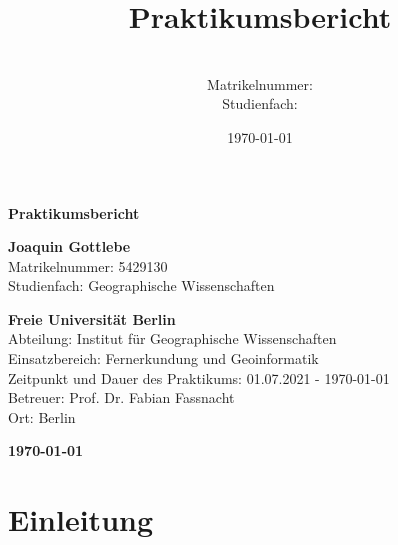 \documentclass[12pt,a4paper]{report}
\title{Praktikumsbericht}
\author{ \\ Matrikelnummer:  \\ Studienfach: }
\date{\today}
\begin{document}
\begin{titlepage}
    \begin{center}
        \vspace*{1cm}
        
        \textbf{\Large Praktikumsbericht}
        
        \vspace{1.5cm}
        
        \textbf{Joaquin Gottlebe} \\
        Matrikelnummer: 5429130 \\
        Studienfach: Geographische Wissenschaften
        
        \vspace{1.5cm}
        
        \textbf{Freie Universität Berlin} \\
        Abteilung: Institut für Geographische Wissenschaften \\
        Einsatzbereich: Fernerkundung und Geoinformatik \\
        Zeitpunkt und Dauer des Praktikums: 01.07.2021 - \today \\
        Betreuer: Prof. Dr. Fabian Fassnacht \\
        Ort: Berlin
        
        \vspace{1.5cm}
        
        \textbf{\today}
    \end{center}
\end{titlepage}

\chapter{Einleitung}
\end{document}
